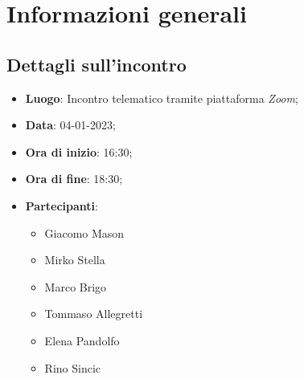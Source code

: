 \section{Informazioni generali}

\subsection{Dettagli sull'incontro}
\begin{itemize}
\item \textbf{Luogo}: Incontro telematico tramite piattaforma \textit{Zoom};
\item \textbf{Data}: 04-01-2023;
\item \textbf{Ora di inizio}: 16:30;
\item \textbf{Ora di fine}: 18:30;
\item \textbf{Partecipanti}: 
\begin{itemize}
	\item Giacomo Mason
	\item Mirko Stella
	\item Marco Brigo
	\item Tommaso Allegretti
	\item Elena Pandolfo
	\item Rino Sincic
\end{itemize}
\end{itemize}